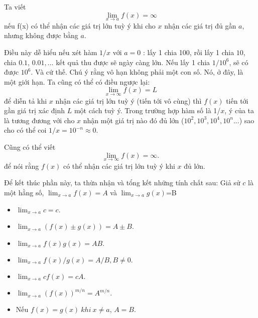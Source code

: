 \begin{definition} Ta viết
    \begin{equation*}\lim_{x\rightarrow a}f(x)=\infty\end{equation*}
nếu f(x) có thể nhận các giá trị lớn tuỳ ý khi cho $x$ nhận các giá trị đủ gần $a$, nhưng không được bằng $a$.
\end{definition}
Điều này dễ hiểu nếu xét hàm $1/x$ với $a=0$ : lấy 1 chia 100, rồi lấy 1 chia $10$, chia $0.1$, $0.01,...$ kết quả thu được sẽ ngày càng lớn. Nếu lấy 1 chia $1/10^6$, sẽ có được $10^6$. Và cứ thế.
Chú ý rằng vô hạn không phải một con số. Nó, ở đây, là một giới hạn.\newline
Ta cũng có thể có điều ngược lại:$$\lim_{x\rightarrow\infty}f(x)=L$$ để diễn tả khi $x$ nhận các giá trị lớn tuỳ ý (tiến tới vô cùng) thì $f(x)$ tiến tới gần giá trị xác định $L$ một cách tuỳ ý. Trong trường hợp hàm số là 1/$x$, ý của ta là tương đương với cho $x$ nhận một giá trị nào đó đủ lớn ($10^2,10^3,10^4,10^n...$) sao cho có thể coi $1/x =10^{-n}\approx 0.$ 

Cũng có thể viết  $$\lim_{x\rightarrow\infty}f(x)=\infty.$$ để nói rằng $f(x)$ có thể nhận các giá trị lớn tuỳ ý khi $x$ đủ lớn.\newline    
\vspace{5pt}

Để kết thúc phần này, ta thừa nhận và tổng kết những tính chất sau: Giả sử $c$ là một hằng số, $\lim_{x\rightarrow a}f(x)=A$ và $\lim_{x\rightarrow a}g(x)$=B
\begin{multicols}{2}
    \begin{itemize}
        \item $\lim_{x\rightarrow a}c = c$.
        \item $\lim_{x\rightarrow a}(f(x)\pm g(x))=A \pm B $.
        \item $\lim_{x\rightarrow a}f(x)g(x)=AB.$
        \item $\lim_{x\rightarrow a}f(x)/g(x)=A/B, B\neq 0.$
        \item $\lim_{x\rightarrow a
        }cf(x)=cA.$
        \item  $\lim_{x\rightarrow a}(f(x))^{m/n}=A^{m/n}.$
        \item Nếu $f(x)=g(x)~khi~x\neq a$, $A=B$.
    \end{itemize}     
\end{multicols}